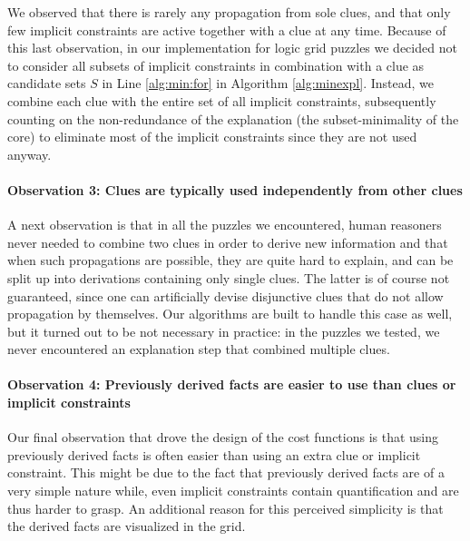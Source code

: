 We observed that there is rarely any propagation from sole clues, and that only few implicit constraints are active together with a clue at any time. 
Because of this last observation, in our implementation for logic grid puzzles we decided not to consider all subsets of implicit constraints in combination with a clue as candidate sets $S$ in Line \ref{alg:min:for} in Algorithm \ref{alg:minexpl}. Instead, we combine each clue with the entire set of all implicit constraints, subsequently counting on the non-redundance of the explanation (the subset-minimality of the core) to eliminate most of the implicit constraints since they are not used anyway. 

\paragraph{Observation 3: Clues are typically used independently from other clues}\label{obs:3:cluesusedindependently}
A next observation is that in all the puzzles we encountered, human reasoners never needed to combine two clues in order to derive new information and that when such propagations are possible, they are quite hard to explain, and can be split up into derivations containing only single clues.
The latter is of course not guaranteed, since one can artificially devise disjunctive clues that do not allow propagation by themselves. 
Our algorithms are built to handle this case as well, but it turned out to be not necessary in practice: in the puzzles we tested, we never encountered an explanation step that combined multiple clues. 


\paragraph{Observation 4: Previously derived facts are easier to use than clues or implicit constraints}\label{observation4}
Our final observation that drove the design of the cost functions is that using previously derived facts is often easier than using an extra clue or implicit constraint. This might be due to the fact that previously derived facts are of a very simple nature while, even implicit constraints contain quantification and are thus harder to grasp. An additional reason for this perceived simplicity is that the derived facts are visualized in the grid. 


